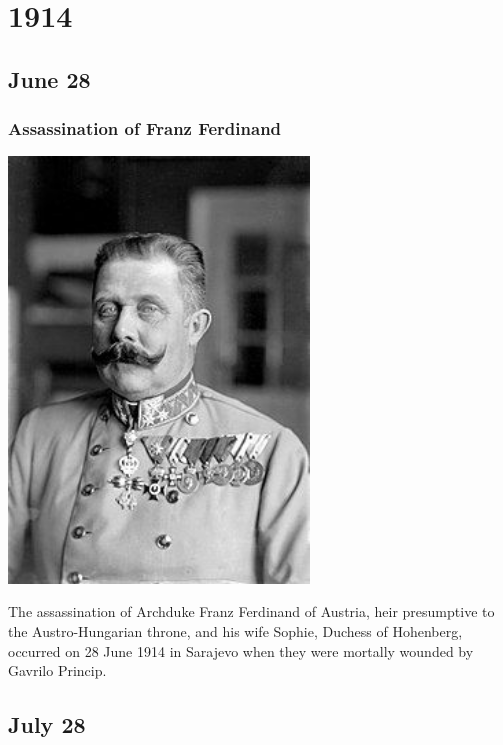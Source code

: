 \documentclass[11pt]{report}
\begin{document}
\chapter{1914}
\section{June 28}
\subsection{Assassination of Franz Ferdinand}
\vspace{2mm}\begin{center}\includegraphics[width=8cm]{./img/ferdinand.jpg}\end{center}
The assassination of Archduke Franz Ferdinand of Austria, heir presumptive to the Austro-Hungarian throne, and his wife Sophie, Duchess of Hohenberg, occurred on 28 June 1914 in Sarajevo when they were mortally wounded by Gavrilo Princip.

\section{July 28}
\end{document}
